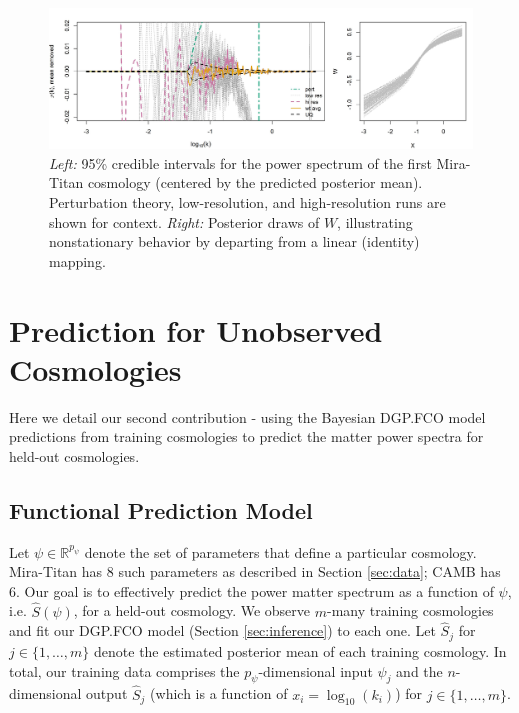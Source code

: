 \documentclass[11pt]{article}
\begin{document}
\begin{figure}[ht]
    \centering
    \includegraphics[width=6in]{plot_fit.jpeg}
    \caption{{\it Left:} 95\% credible intervals for the power spectrum of the first Mira-Titan
    cosmology (centered by the predicted posterior mean). Perturbation theory, 
    low-resolution, and high-resolution runs are shown for context. {\it Right:} Posterior draws
    of $W$, illustrating nonstationary behavior by departing from a linear (identity) mapping.}
    \label{fig:plot_fit}
\end{figure}

\section{Prediction for Unobserved Cosmologies}
\label{sec:pred}

Here we detail our second contribution - using the Bayesian DGP.FCO model predictions
from training cosmologies to predict the matter power spectra for held-out cosmologies. 

\subsection{Functional Prediction Model}
\label{subsec:pca}

Let $\psi \in \mathbb{R}^{p_\psi}$ denote the set of parameters that define a particular cosmology.
Mira-Titan has 8 such parameters as described in Section \ref{sec:data}; CAMB has 6.
Our goal is to effectively predict the power matter spectrum as a function of $\psi$, i.e. $\hat{S}(\psi)$, 
for a held-out cosmology.  We observe $m$-many training cosmologies and fit our DGP.FCO 
model (Section \ref{sec:inference}) to each one.  Let $\hat{S}_j$ for $j \in \{1,\ldots,m\}$ denote
the estimated posterior mean of each training cosmology.  In total, our training data comprises
the $p_\psi$-dimensional input $\psi_j$ and the $n$-dimensional output $\hat{S}_j$ (which is a 
function of $x_i = \log_{10}(k_i)$) for $j \in \{1,\ldots,m\}$.
\end{document}
